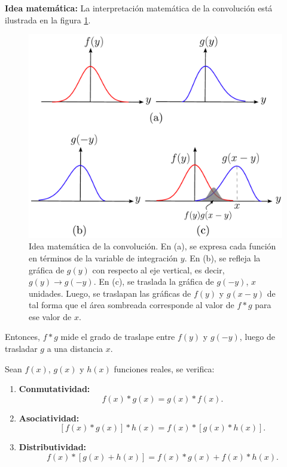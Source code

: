 \textbf{Idea matemática:} La interpretación matemática de la convolución está ilustrada en la figura \ref{fig:IdeaConvolucion}.

\begin{figure}[H]
    \centering
    \includegraphics[scale = 0.55]{Figuras/Idea-Convolucion.pdf}
    \caption{Idea matemática de la convolución. En (a), se expresa cada función en términos de la variable de integración $y$. En (b), se refleja la gráfica de $g(y)$ con respecto al eje vertical, es decir, $g(y) \rightarrow g(-y)$. En (c), se traslada la gráfica de $g(-y)$, $x$ unidades. Luego, se traslapan las gráficas de $f(y)$ y $g(x-y)$ de tal forma que el área sombreada corresponde al valor de $f * g$ para ese valor de $x$.}
    \label{fig:IdeaConvolucion}
\end{figure}


Entonces, $f * g$ mide el grado de traslape entre $f(y)$ y $g(-y)$, luego de trasladar $g$ a una distancia $x$.

\begin{propo}
Sean $f(x)$, $g(x)$ y $h(x)$  funciones reales, se verifica:

\begin{enumerate}
    \item \textbf{Conmutatividad:}$$f(x) * g(x) = g(x) * f(x).$$
    
    \item \textbf{Asociatividad:} $$[f(x)*g(x)]*h(x) = f(x)*[g(x)*h(x)].$$
    
    \item \textbf{Distributividad:} $$f(x)*[g(x)+h(x)] = f(x)*g(x) + f(x)*h(x).$$ 
\end{enumerate}
\end{propo}


